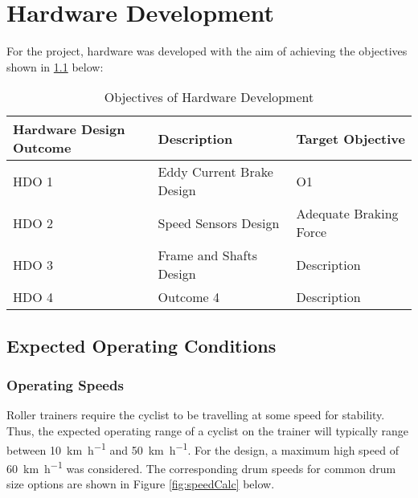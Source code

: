 
\chapter{Hardware Development}

For the project, hardware was developed with the aim of achieving the objectives shown in \ref{tab:devgoals} below:

\begin{table}[h!]
	\renewcommand{\arraystretch}{1.2}
	\centering
	\caption{Objectives of Hardware Development}
	\begin{tabularx}{\textwidth}{p{3.2cm} >{\raggedright}p{5cm} >{\raggedright\arraybackslash}X}
		\toprule
		Hardware Design Outcome & Description               & Target Objective       \\
		\midrule
		HDO 1                   & Eddy Current Brake Design & O1                     \\
		HDO 2                   & Speed Sensors Design      & Adequate Braking Force \\
		HDO 3                   & Frame and Shafts Design   & Description            \\
		HDO 4                   & Outcome 4                 & Description            \\
		\bottomrule
	\end{tabularx}
	\label{tab:devgoals}
\end{table}

\newpage

\section{Expected Operating Conditions}

\subsection{Operating Speeds}
\label{sec:opspeed}

Roller trainers require the cyclist to be travelling at some speed for stability. Thus, the expected operating range of a cyclist on the trainer will typically range between \SI{10}{\kilo\meter\per\hour} and \SI{50}{\kilo\meter\per\hour}. For the design, a maximum high speed of \SI{60}{\kilo\meter\per\hour} was considered. The corresponding drum speeds for common drum size options are shown in Figure \ref{fig:speedCalc} below.

